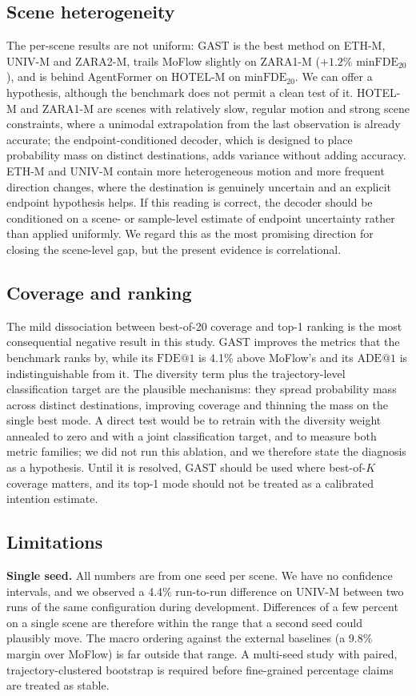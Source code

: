 \subsection{Scene heterogeneity}
The per-scene results are not uniform: GAST is the best method on ETH-M, UNIV-M and ZARA2-M, trails MoFlow slightly on ZARA1-M ($+1.2\%$ $\mathrm{minFDE}_{20}$), and is behind AgentFormer on HOTEL-M on $\mathrm{minFDE}_{20}$. We can offer a hypothesis, although the benchmark does not permit a clean test of it. HOTEL-M and ZARA1-M are scenes with relatively slow, regular motion and strong scene constraints, where a unimodal extrapolation from the last observation is already accurate; the endpoint-conditioned decoder, which is designed to place probability mass on distinct destinations, adds variance without adding accuracy. ETH-M and UNIV-M contain more heterogeneous motion and more frequent direction changes, where the destination is genuinely uncertain and an explicit endpoint hypothesis helps. If this reading is correct, the decoder should be conditioned on a scene- or sample-level estimate of endpoint uncertainty rather than applied uniformly. We regard this as the most promising direction for closing the scene-level gap, but the present evidence is correlational.

\subsection{Coverage and ranking}
The mild dissociation between best-of-20 coverage and top-1 ranking is the most consequential negative result in this study. GAST improves the metrics that the benchmark ranks by, while its $\mathrm{FDE@1}$ is 4.1\% above MoFlow's and its $\mathrm{ADE@1}$ is indistinguishable from it. The diversity term plus the trajectory-level classification target are the plausible mechanisms: they spread probability mass across distinct destinations, improving coverage and thinning the mass on the single best mode. A direct test would be to retrain with the diversity weight annealed to zero and with a joint classification target, and to measure both metric families; we did not run this ablation, and we therefore state the diagnosis as a hypothesis. Until it is resolved, GAST should be used where best-of-$K$ coverage matters, and its top-1 mode should not be treated as a calibrated intention estimate.

\subsection{Limitations}
\textbf{Single seed.} All numbers are from one seed per scene. We have no confidence intervals, and we observed a 4.4\% run-to-run difference on UNIV-M between two runs of the same configuration during development. Differences of a few percent on a single scene are therefore within the range that a second seed could plausibly move. The macro ordering against the external baselines (a 9.8\% margin over MoFlow) is far outside that range. A multi-seed study with paired, trajectory-clustered bootstrap is required before fine-grained percentage claims are treated as stable.

